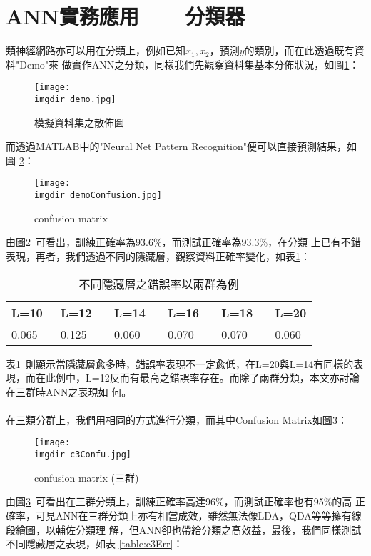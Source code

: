 	\section{ANN實務應用——分類器}
		類神經網路亦可以用在分類上，例如已知$x_1,x_2$，預測$y$的類別，而在此透過既有資料"Demo"來			做實作ANN之分類，同樣我們先觀察資料集基本分佈狀況，如圖\ref{fig:demo}：
		\begin{figure}[H]	
			\centering	 			 	 
   			\texttt{[image: \\imgdir demo.jpg]} 
   			\caption{模擬資料集之散佈圖}
   			\label{fig:demo}   			 		 
		\end{figure}
		而透過MATLAB中的"Neural Net Pattern Recognition"便可以直接預測結果，如圖						\ref{fig:demoConfusion}：
		\begin{figure}[H]	
			\centering	 			 	 
   			\texttt{[image: \\imgdir demoConfusion.jpg]} 
   			\caption{confusion matrix}
   			\label{fig:demoConfusion}   			 		 
		\end{figure}
		由圖\ref{fig:demoConfusion}\ 可看出，訓練正確率為93.6\%，而測試正確率為93.3\%，在分類			上已有不錯表現，再者，我們透過不同的隱藏層，觀察資料正確率變化，如表\ref{table:c2Err}：
		\begin{table}[H]				
			\caption{不同隱藏層之錯誤率以兩群為例}\label{table:c2Err}
			\centering
			\extrarowheight=8pt
			\begin{tabular}{llllll} 					
				\hline
				L=10\ &L=12 \ &L=14 \ &L=16 \ &L=18 \ &L=20\\ \hline	
				0.065\ & 0.125\ & 0.060\ & 0.070\ & 0.070\ & 0.060\\ \hline	
			\end{tabular}
		\end{table}
		表\ref{table:c2Err}\ 則顯示當隱藏層愈多時，錯誤率表現不一定愈低，在L=20與L=14有同樣的表			現，而在此例中，L=12反而有最高之錯誤率存在。而除了兩群分類，本文亦討論在三群時ANN之表現如			何。
		\\
		\\
		在三類分群上，我們用相同的方式進行分類，而其中Confusion Matrix如圖\ref{fig:c3Confu}：
		\begin{figure}[H]	
			\centering	 			 	 
   			\texttt{[image: \\imgdir c3Confu.jpg]} 
   			\caption{confusion matrix (三群)}
   			\label{fig:c3Confu}   			 		 
		\end{figure}
		由圖\ref{fig:c3Confu}\ 可看出在三群分類上，訓練正確率高達96\%，而測試正確率也有95\%的高			正確率，可見ANN在三群分類上亦有相當成效，雖然無法像LDA，QDA等等擁有線段繪圖，以輔佐分類理			解，但ANN卻也帶給分類之高效益，最後，我們同樣測試不同隱藏層之表現，如表							\ref{table:c3Err}：

